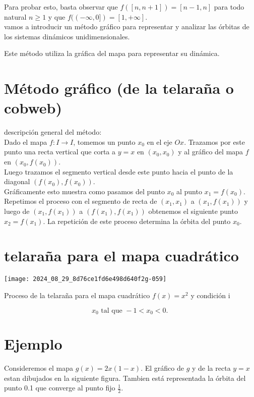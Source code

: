 \documentclass[11pt]{beamer}
\begin{document}
Para probar esto, basta observar que $f([n, n+1])=[n-1, n]$ para todo natural $n \geq 1$ y que $f((-\infty, 0])=[1,+\infty]$.\\
vamos a introducir un método gráfico para representar y analizar las órbitas de los sistemas dinámicos unidimensionales.

Este método utiliza la gráfica del mapa para representar su dinámica.

\section*{Método gráfico (de la telaraña o cobweb)}
descripción general del método:\\
Dado el mapa $f: I \rightarrow I$, tomemos un punto $x_{0}$ en el eje $O x$. Trazamos por este punto una recta vertical que corta a $y=x$ en $\left(x_{0}, x_{0}\right)$ y al gráfico del mapa $f$ en $\left(x_{0}, f\left(x_{0}\right)\right)$.\\
Luego trazamos el segmento vertical desde este punto hacia el punto de la diagonal $\left(f\left(x_{0}\right), f\left(x_{0}\right)\right)$.\\
Gráficamente esto muestra como pasamos del punto $x_{0}$ al punto $x_{1}=f\left(x_{0}\right)$. Repetimos el proceso con el segmento de recta de $\left(x_{1}, x_{1}\right)$ a $\left(x_{1}, f\left(x_{1}\right)\right)$ y luego de $\left(x_{1}, f\left(x_{1}\right)\right)$ a $\left(f\left(x_{1}\right), f\left(x_{1}\right)\right)$ obtenemos el siguiente punto $x_{2}=f\left(x_{1}\right)$. La repetición de este proceso determina la órbita del punto $x_{0}$.

\section*{telaraña para el mapa cuadrático}
\begin{center}
\texttt{[image: 2024\_08\_29\_8d76ce1fd6e498d640f2g-059]}
\end{center}

Proceso de la telaraña para el mapa cuadrático $f(x)=x^{2}$ y condición i

$$
x_{0} \text { tal que }-1<x_{0}<0 \text {. }
$$

\section*{Ejemplo}
Consideremos el mapa $g(x)=2 x(1-x)$. El gráfico de $g$ y de la recta $y=x$ estan dibujados en la siguiente figura. Tambien está representada la órbita del punto 0.1 que converge al punto fijo $\frac{1}{2}$.
\end{document}
